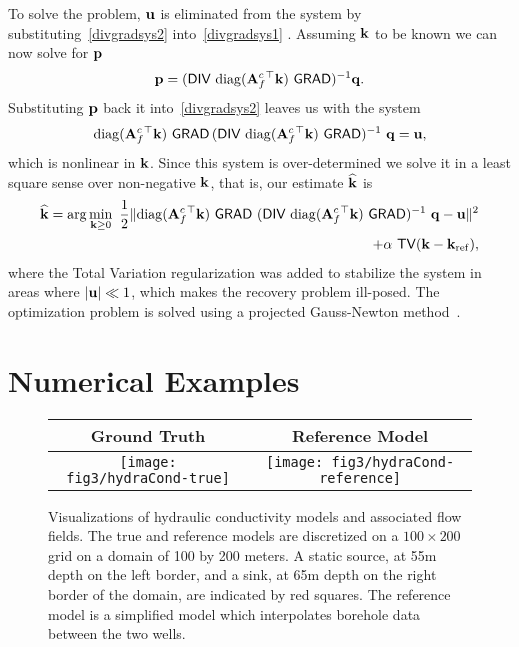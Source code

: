 \documentclass[english]{siamltex}
\newcommand {\bfu}   { {\bf u} }
\newcommand {\bfq}   { {\bf q} }
\newcommand {\bfp}   { {\bf p} }
\newcommand {\bfk}   { {\bf k} }
\newcommand {\bfA}  { {\bf A} }
\renewcommand {\diag}	 { \mathrm{diag} }
\newcommand{\hf}		 {\frac12}
\newcommand{\DIVh}   {{\textsf{DIV}}}  %
\newcommand{\GRADh}  {{\textsf{GRAD}}} %
\begin{document}
To solve the problem, $\bfu$ is eliminated from the system by substituting~\eqref{divgradsys2} into~\eqref{divgradsys1} .
Assuming $\bfk$ to be known we can now solve for $\bfp$ 
$$ \bfp = (\DIVh\ \diag (\bfA_{f}^{c\, \top} \bfk)\ \GRADh)^{-1} \bfq. $$
Substituting $\bfp$ back it into~\eqref{divgradsys2} leaves us with the system
$$ \diag (\bfA_{f}^{c\, \top} \bfk)\ \GRADh\, (\DIVh\ \diag (\bfA_{f}^{c\, \top} \bfk)\ \GRADh)^{-1}\ \bfq = \bfu, $$
which is nonlinear in $\bfk$.
Since this system is over-determined we solve it in a least square sense over non-negative $\bfk$, that is,
our estimate $\widehat \bfk$ is
\begin{eqnarray}
\label{condest}
\widehat \bfk = {\rm arg}\min_{\bfk \ge 0}\ \hf \|
\diag (\bfA_{f}^{c\, \top} \bfk)\ \GRADh\ (\DIVh\ \diag (\bfA_{f}^{c\, \top} \bfk)\ \GRADh)^{-1}\ \bfq - \bfu \|^{2}\\
\nonumber
+ \alpha\ {\sf TV}(\bfk -\bfk_{\rm ref}),
\end{eqnarray}
where the Total Variation regularization was added to stabilize the system in areas where $|\bfu| \ll 1$, which
makes the recovery problem ill-posed.
The optimization problem 
is solved using a projected Gauss-Newton method~\cite{kelley2}.

\section{Numerical Examples}
\label{sec:numerical_examples}

\begin{figure}[t]
	\renewcommand{\arraystretch}{1.5}
	\begin{center}
		\iwidth=60mm
		\begin{tabular}{@{}|@{}c@{}|@{}c@{}|@{}} %
			\hline		
			Ground Truth 
			&
			Reference Model 			
			\\
			\hline		
			\texttt{[image: fig3/hydraCond-true]}
			&
			\texttt{[image: fig3/hydraCond-reference]}
			\\
			\hline
		\end{tabular}
	\end{center}
	\caption{Visualizations of hydraulic conductivity models and associated flow fields. The true and  reference models are discretized on a $100\times200$ grid on a domain of 100 by 200 meters.  A static source, at 55m depth on the left border, and a sink, at 65m depth on the right border of the domain, are indicated by red squares. The reference model is a simplified model which interpolates borehole data between the two wells. 
	}
	\label{fig:conductivityModels}
\end{figure}
\end{document}
